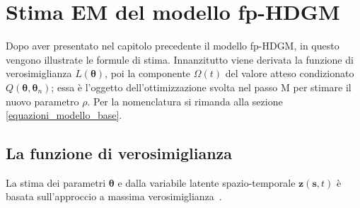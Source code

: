 \chapter[Stima EM del modello fp-HDGM]{Stima EM del modello fp-HDGM}

Dopo aver presentato nel capitolo precedente il modello fp-HDGM, in questo vengono illustrate le formule di stima. Innanzitutto viene derivata la funzione di verosimiglianza $L(\boldsymbol{\theta})$, poi la componente $\Omega(t)$ del valore atteso condizionato $Q(\boldsymbol{\theta}, \boldsymbol{\theta}_n)$; essa è l'oggetto dell'ottimizzazione svolta nel passo M per stimare il nuovo parametro $\rho$. Per la nomenclatura si rimanda alla sezione \ref{equazioni_modello_base}.

\section[La funzione di verosimiglianza]{La funzione di verosimiglianza}
La stima dei parametri $\boldsymbol{\theta}$ e dalla variabile latente spazio-temporale $\mathbf{z}(\mathbf{s}, t)$ è basata sull'approccio a massima verosimiglianza~\citep{paper_f_HDGM}.

